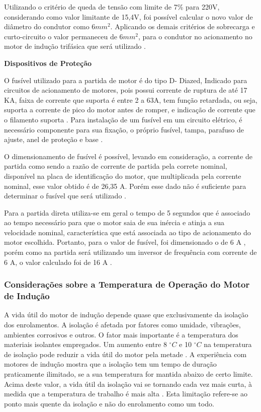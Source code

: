 	Utilizando o critério de queda de tensão com limite de 7\% para 220V, considerando como valor limitante de 15,4V, foi possível calcular o novo valor de diâmetro do condutor como 6$mm^{2}$. Aplicando os demais critérios de sobrecarga e curto-circuito o valor permaneceu de 6$mm^{2}$, para o condutor no acionamento no motor de indução trifásica que será utilizado \cite{NBR5410}.

	\textbf{Dispositivos de Proteção}

	O fusível utilizado para a partida de motor é do tipo D- Diazed, Indicado para circuitos de acionamento de motores, pois possui corrente de ruptura de até 17 KA, faixa de corrente que suporta é entre 2 a 63A, tem função retardada, ou seja, suporta a corrente de pico do motor antes de romper, e indicação de corrente que o filamento suporta \cite{WEG04}. Para instalação de um fusível em um circuito elétrico, é necessário componente para sua fixação, o próprio fusível, tampa, parafuso de ajuste, anel de proteção e base \cite{WEG04}.
	
	O dimensionamento de fusível é possível, levando em consideração, a corrente de partida como sendo a razão de corrente de partida pela correte nominal, disponível na placa de identificação do motor, que multiplicada pela corrente nominal, esse valor obtido é de 26,35 A. Porém esse dado não é suficiente para determinar o fusível que será utilizado \cite{WEG04}.
	
	Para a partida direta utiliza-se em geral o tempo de 5 segundos que é associado ao tempo necessário para que o motor saia de sua inércia e atinja a sua velocidade nominal, característica que está associada ao tipo de acionamento do motor escolhida. Portanto, para o valor de fusível, foi dimensionado o de 6 A , porém como na partida será utilizando um inversor de frequência com corrente de 6 A, o valor calculado foi de 16 A \cite{WEG04} \cite{NBR5410}.


\subsubsection{Considerações sobre a Temperatura de Operação do Motor de Indução}
	
	A vida útil do motor de indução depende quase que exclusivamente da isolação dos enrolamentos. A isolação é afetada por fatores como umidade, vibrações, ambientes corrosivos e outros. O fator mais importante é a temperatura dos materiais isolantes empregados. Um aumento entre 8 $^{\circ}C$ e 10 $^{\circ}C$ na temperatura de isolação pode reduzir a vida útil do motor pela metade \cite{Goncalez}. A experiência com motores de indução mostra que a isolação tem um tempo de duração praticamente ilimitado, se a sua temperatura for mantida abaixo de certo limite. Acima deste valor, a vida útil da isolação vai se tornando cada vez mais curta, à medida que a temperatura de trabalho é mais alta \cite{Goncalez}. Esta limitação refere-se ao ponto mais quente da isolação e não do enrolamento como um todo.
	
